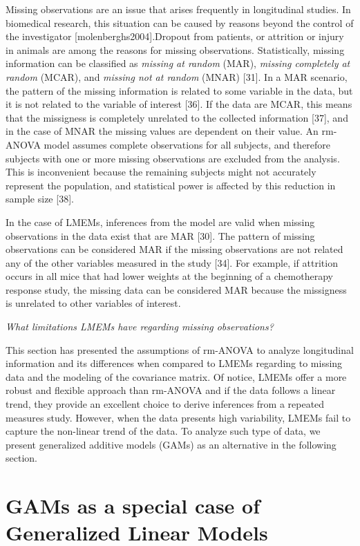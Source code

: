 \documentclass[
]{article}
\begin{document}
Missing observations are an issue that arises frequently in longitudinal studies. In biomedical research, this situation can be caused by reasons beyond the control of the investigator {[}molenberghs2004{]}.Dropout from patients, or attrition or injury in animals are among the reasons for missing observations. Statistically, missing information can be classified as \emph{missing at random} (MAR), \emph{missing completely at random} (MCAR), and \emph{missing not at random} (MNAR) {[}31{]}. In a MAR scenario, the pattern of the missing information is related to some variable in the data, but it is not related to the variable of interest {[}36{]}. If the data are MCAR, this means that the missigness is completely unrelated to the collected information {[}37{]}, and in the case of MNAR the missing values are dependent on their value. An rm-ANOVA model assumes complete observations for all subjects, and therefore subjects with one or more missing observations are excluded from the analysis. This is inconvenient because the remaining subjects might not accurately represent the population, and statistical power is affected by this reduction in sample size {[}38{]}.

In the case of LMEMs, inferences from the model are valid when missing observations in the data exist that are MAR {[}30{]}. The pattern of missing observations can be considered MAR if the missing observations are not related any of the other variables measured in the study {[}34{]}. For example, if attrition occurs in all mice that had lower weights at the beginning of a chemotherapy response study, the missing data can be considered MAR because the missigness is unrelated to other variables of interest.

\emph{What limitations LMEMs have regarding missing observations?}

This section has presented the assumptions of rm-ANOVA to analyze longitudinal information and its differences when compared to LMEMs regarding to missing data and the modeling of the covariance matrix. Of notice, LMEMs offer a more robust and flexible approach than rm-ANOVA and if the data follows a linear trend, they provide an excellent choice to derive inferences from a repeated measures study. However, when the data presents high variability, LMEMs fail to capture the non-linear trend of the data. To analyze such type of data, we present generalized additive models (GAMs) as an alternative in the following section.

\hypertarget{gams-as-a-special-case-of-generalized-linear-models}{%
\section{GAMs as a special case of Generalized Linear Models}\label{gams-as-a-special-case-of-generalized-linear-models}}
\end{document}
